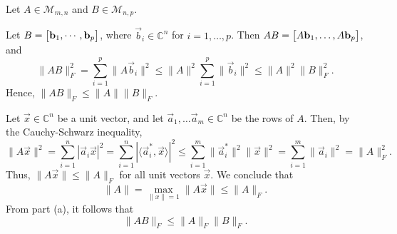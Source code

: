 \documentclass{homework}
\begin{document}
	\question Let $A \in \mathcal{M}_{m,n}$ and $B \in \mathcal{M}_{n,p}$.
	\begin{alphaparts}
		\questionpart Let $B = \left[\begin{matrix}\mathbf{b}_1, \cdots, \mathbf{b}_p\end{matrix}\right]$, where $\vec{b}_i \in \mathbb{C}^n$ for $i = 1,\dots, p$. Then $AB = \left[\begin{matrix}A\mathbf{b}_1, \dots, A\mathbf{b}_p\end{matrix}\right]$, and
		\begin{equation*}
			\lVert AB \rVert_F^2 = \sum_{i=1}^p \lVert A\vec{b}_i\rVert^2 \le \lVert A\rVert^2\sum_{i=1}^p\lVert \vec{b}_i\rVert^2 \le \lVert A\rVert^2\lVert B\rVert_F^2.
		\end{equation*}
		Hence, $\lVert AB \rVert_F \le \lVert A\rVert \lVert B\rVert_F$.
		
		\questionpart Let $\vec{x} \in \mathbb{C}^n$ be a unit vector, and let $\vec{a}_1, \dots \vec{a}_m \in \mathbb{C}^n$ be the rows of $A$. Then, by the Cauchy-Schwarz inequality,
		\begin{equation*}
			\lVert A\vec{x}\rVert^2 = \sum_{i=1}^n |\vec{a}_i\vec{x}|^2 =\sum_{i=1}^n |\langle\vec{a}_i^*, \vec{x}\rangle|^2\le \sum_{i=1}^m \lVert \vec{a}_i^*\rVert^2 \lVert \vec{x}\rVert^2 = \sum_{i=1}^m \lVert \vec{a}_i\rVert^2 = \lVert A \rVert_F^2.
		\end{equation*}
		Thus, $\lVert A\vec{x}\rVert \le \lVert A\rVert_F$ for all unit vectors $\vec{x}$. We conclude that
		\begin{equation*}
			\lVert A \rVert = \max_{\lVert x\rVert=1}\lVert A\vec{x}\rVert \le \lVert A\rVert_F.
		\end{equation*}
		From part (a), it follows that
		\begin{equation*}
			\lVert AB \rVert_F \le \lVert A\rVert_F\lVert B\rVert_F.
		\end{equation*}
	\end{alphaparts}
	
\end{document}
